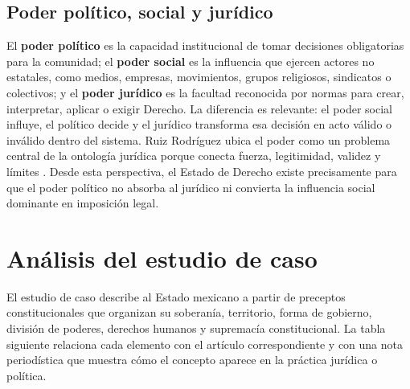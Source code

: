 \documentclass[
	spanish,
	letterpaper, oneside
]{article}
\begin{document}
\subsection{Poder político, social y jurídico}

El \textbf{poder político} es la capacidad institucional de tomar decisiones obligatorias para la comunidad; el \textbf{poder social} es la influencia que ejercen actores no estatales, como medios, empresas, movimientos, grupos religiosos, sindicatos o colectivos; y el \textbf{poder jurídico} es la facultad reconocida por normas para crear, interpretar, aplicar o exigir Derecho. La diferencia es relevante: el poder social influye, el político decide y el jurídico transforma esa decisión en acto válido o inválido dentro del sistema. Ruiz Rodríguez ubica el poder como un problema central de la ontología jurídica porque conecta fuerza, legitimidad, validez y límites \citep{ruizrodriguezFilosofiaDerecho2009}. Desde esta perspectiva, el Estado de Derecho existe precisamente para que el poder político no absorba al jurídico ni convierta la influencia social dominante en imposición legal.

\section{Análisis del estudio de caso}

El estudio de caso describe al Estado mexicano a partir de preceptos constitucionales que organizan su soberanía, territorio, forma de gobierno, división de poderes, derechos humanos y supremacía constitucional. La tabla siguiente relaciona cada elemento con el artículo correspondiente y con una nota periodística que muestra cómo el concepto aparece en la práctica jurídica o política.
\end{document}
